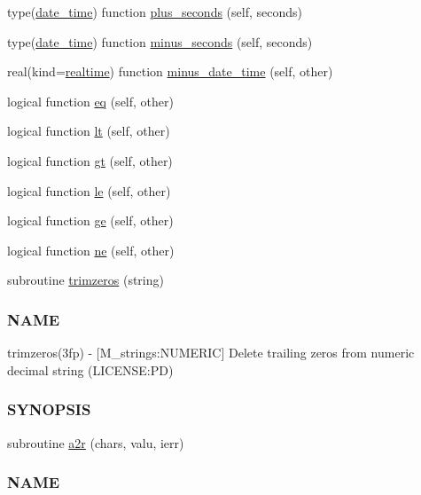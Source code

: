 \begin{DoxyCompactItemize}
\item 
type(\mbox{\hyperlink{structm__time_1_1date__time}{date\+\_\+time}}) function \mbox{\hyperlink{namespacem__time_a76e79ee87552ce537cbb674a21b05b5c}{plus\+\_\+seconds}} (self, seconds)
\item 
type(\mbox{\hyperlink{structm__time_1_1date__time}{date\+\_\+time}}) function \mbox{\hyperlink{namespacem__time_a0d241cbb8f2e30a64b53f4aae4100709}{minus\+\_\+seconds}} (self, seconds)
\item 
real(kind=\mbox{\hyperlink{namespacem__time_ac10ea9e8d59ec74eaa7d89f2517d7422}{realtime}}) function \mbox{\hyperlink{namespacem__time_ae81a89463c40f33a14b1b2d49f797643}{minus\+\_\+date\+\_\+time}} (self, other)
\item 
logical function \mbox{\hyperlink{namespacem__time_a7d365fb381fa8f5f79a4263c9f678b98}{eq}} (self, other)
\item 
logical function \mbox{\hyperlink{namespacem__time_a2cc7f6c40c8ef5aeef08cd51912987d7}{lt}} (self, other)
\item 
logical function \mbox{\hyperlink{namespacem__time_a62a48ba3b42ccf837b48584293231021}{gt}} (self, other)
\item 
logical function \mbox{\hyperlink{namespacem__time_a498bb2830d153743d9624e65e92d4f6c}{le}} (self, other)
\item 
logical function \mbox{\hyperlink{namespacem__time_aae8c0dfd78a61889a0d6444448ac0bb9}{ge}} (self, other)
\item 
logical function \mbox{\hyperlink{namespacem__time_ac0e0df383f424680ce59f5540e02348b}{ne}} (self, other)
\item 
subroutine \mbox{\hyperlink{namespacem__time_a5d9e4a12c3418d67dc69a87780053d67}{trimzeros}} (string)
\begin{DoxyCompactList}\small\item\em \subsubsection*{N\+A\+ME}

trimzeros(3fp) -\/ \mbox{[}M\+\_\+strings\+:N\+U\+M\+E\+R\+IC\mbox{]} Delete trailing zeros from numeric decimal string (L\+I\+C\+E\+N\+SE\+:PD) \subsubsection*{S\+Y\+N\+O\+P\+S\+IS}\end{DoxyCompactList}\item 
subroutine \mbox{\hyperlink{namespacem__time_a85f3492133b49248e415771ff4da0b95}{a2r}} (chars, valu, ierr)
\begin{DoxyCompactList}\small\item\em \subsubsection*{N\+A\+ME}


\end{DoxyCompactList}
\end{DoxyCompactItemize}
